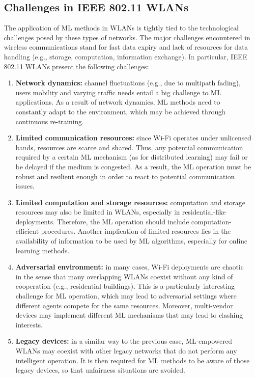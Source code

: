 \documentclass[twocolumn]{article}
\begin{document}
\subsection{Challenges in IEEE 802.11 WLANs}
\label{section:ieee_80211_wlans}
The application of ML methods in WLANs is tightly tied to the technological challenges posed by these types of networks. The major challenges encountered in wireless communications stand for fast data expiry and lack of resources for data handling (e.g., storage, computation, information exchange). In particular, IEEE 802.11 WLANs present the following challenges:
\begin{enumerate}
    \item \textbf{Network dynamics:} channel fluctuations (e.g., due to multipath fading), users mobility and varying traffic needs entail a big challenge to ML applications. As a result of network dynamics, ML methods need to constantly adapt to the environment, which may be achieved through continuous re-training.
    \item \textbf{Limited communication resources:} since Wi-Fi operates under unlicensed bands, resources are scarce and shared. Thus, any potential communication required by a certain ML mechanism (as for distributed learning) may fail or be delayed if the medium is congested. As a result, the ML operation must be robust and resilient enough in order to react to potential communication issues.
    \item \textbf{Limited computation and storage resources:} computation and storage resources may also be limited in WLANs, especially in residential-like deployments. Therefore, the ML operation should include computation-efficient procedures. Another implication of limited resources lies in the availability of information to be used by ML algorithms, especially for online learning methods.
    \item \textbf{Adversarial environment:} in many cases, Wi-Fi deployments are chaotic in the sense that many overlapping WLANs coexist without any kind of cooperation (e.g., residential buildings). This is a particularly interesting challenge for ML operation, which may lead to adversarial settings where different agents compete for the same resources. Moreover, multi-vendor devices may implement different ML mechanisms that may lead to clashing interests.
    \item \textbf{Legacy devices:} in a similar way to the previous case, ML-empowered WLANs may coexist with other legacy networks that do not perform any intelligent operation. It is then required for ML methods to be aware of those legacy devices, so that unfairness situations are avoided.
\end{enumerate}
\end{document}
